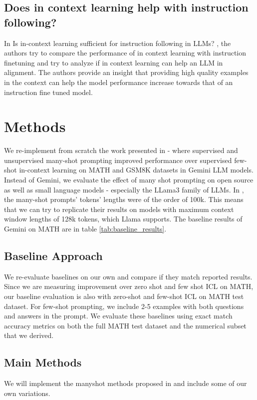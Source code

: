 \documentclass[twocolumn,11pt]{article}
\begin{document}
\subsection{Does in context learning help with instruction following?}
In Is in-context learning sufficient for instruction following in LLMs? \cite{zhao2024incontextlearningsufficientinstruction}, the authors try to compare the performance of in context learning with instruction finetuning and try to analyze if in context learning can help an LLM in alignment. The authors provide an insight that providing high quality examples in the context can help the model performance increase towards that of an instruction fine tuned model.

\section{Methods}
We re-implement from scratch the work presented in \cite{agarwal2024manyshotincontextlearning} - where supervised and unsupervised many-shot prompting improved performance over supervised few-shot in-context learning on MATH and GSM8K datasets in Gemini LLM models. Instead of Gemini, we evaluate the effect of many shot prompting on open source as well as small language models - especially the LLama3 family of LLMs. In \cite{agarwal2024manyshotincontextlearning}, the many-shot prompts' tokens' lengths were of the order of 100k. This means that we can try to replicate their results on models with maximum context window lengths of 128k tokens, which Llama supports. The baseline results of Gemini on MATH are in table \ref{tab:baseline_results}.

\subsection{Baseline Approach}
We re-evaluate baselines on our own and compare if they match reported results. Since we are measuring improvement over zero shot and few shot ICL on MATH, our baseline evaluation is also with zero-shot and few-shot ICL on MATH test dataset. For few-shot prompting, we include 2-5 examples with both questions and answers in the prompt. We evaluate these baselines using exact match accuracy metrics on both the full MATH test dataset and the numerical subset that we derived.

\subsection{Main Methods}
We will implement the manyshot methods proposed in \cite{agarwal2024manyshotincontextlearning} and include some of our own variations.
\end{document}
